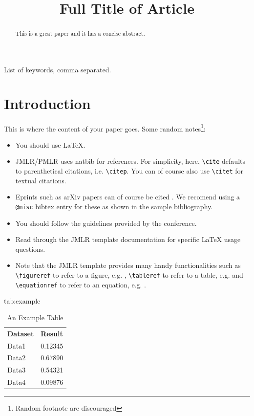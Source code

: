 \documentclass{midl} %
\title[Short Title]{Full Title of Article}
\begin{document}
\maketitle

\begin{abstract}
This is a great paper and it has a concise abstract.
\end{abstract}

\begin{keywords}
List of keywords, comma separated.
\end{keywords}

\section{Introduction}

This is where the content of your paper goes.  Some random
notes\footnote{Random footnote are discouraged}:
\begin{itemize}
\item You should use \LaTeX \cite{Lamport:Book:1989}.
\item JMLR/PMLR uses natbib for references. For simplicity, here, \verb|\cite|  defaults to
  parenthetical citations, i.e. \verb|\citep|. You can of course also
  use \verb|\citet| for textual citations.
\item Eprints such as arXiv papers can of course be cited \cite{Hinton:arXiv:2015:Distilling}. We recomend using a \verb|@misc| bibtex entry for these as shown in the sample bibliography.
\item You should follow the guidelines provided by the conference.
\item Read through the JMLR template documentation for specific \LaTeX
  usage questions.
\item Note that the JMLR template provides many handy functionalities
such as \verb|\figureref| to refer to a figure,
e.g. ,  \verb|\tableref| to refer to a table,
e.g.  and \verb|\equationref| to refer to an equation,
e.g. .
\end{itemize}

\begin{table}[htbp]
\floatconts
  {tab:example}%
  {\caption{An Example Table}}%
  {\begin{tabular}{ll}
  \bfseries Dataset & \bfseries Result\\
  Data1 & 0.12345\\
  Data2 & 0.67890\\
  Data3 & 0.54321\\
  Data4 & 0.09876
  \end{tabular}}
\end{table}
\end{document}

